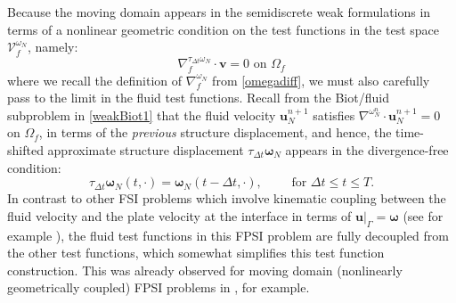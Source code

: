 \documentclass[11pt]{article}
\newcommand{\bd}{\boldsymbol}
\theoremstyle{definition}
\begin{document}
Because the moving domain appears in the semidiscrete weak formulations in terms of a nonlinear geometric condition on the test functions in the test space $\mathcal{V}^{\omega_{N}}_{f}$, namely:
\begin{equation*}
\nabla^{\tau_{\Delta t}\omega_{N}}_{f} \cdot \bd{v} = 0 \text{ on } \Omega_{f}
\end{equation*}
where we recall the definition of $\nabla^{\omega_{N}}_{f}$ from \eqref{omegadiff}, we must also carefully pass to the limit in the fluid test functions. Recall from the Biot/fluid subproblem in \eqref{weakBiot1} that the fluid velocity $\bd{u}^{n + 1}_{N}$ satisfies $\nabla^{\omega^{n}_{N}} \cdot \bd{u}^{n + 1}_{N} = 0$ on $\Omega_{f}$, in terms of the \textit{previous} structure displacement, and hence, the time-shifted approximate structure displacement $\tau_{\Delta t}\bd{\omega}_{N}$ appears in the divergence-free condition:
\begin{equation*}
\tau_{\Delta t} \bd{\omega}_{N}(t, \cdot) = \bd{\omega}_{N}(t - \Delta t, \cdot), \qquad \text{ for } \Delta t \le t \le T.
\end{equation*}
In contrast to other FSI problems which involve kinematic coupling between the fluid velocity and the plate velocity at the interface in terms of $\bd{u}|_{\Gamma} = \bd{\omega}$ (see for example \cite{MuhaCanic13}), the fluid test functions in this FPSI problem are fully decoupled from the other test functions, which somewhat simplifies this test function construction. This was already observed for moving domain (nonlinearly geometrically coupled) FPSI problems in \cite{FPSIJMPA}, for example.
\end{document}
